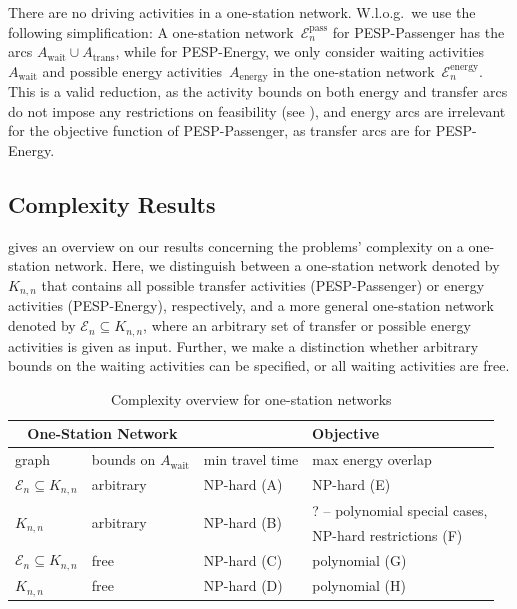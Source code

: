 \documentclass[11pt,a4paper]{article}
\newcommand{\wait}{\mathrm{wait}}
\newcommand{\transfer}{\mathrm{trans}}
\newcommand{\energy}{\mathrm{energy}}
\newcommand{\pesppassenger}{PESP-Passenger\xspace}
\newcommand{\pespenergy}{PESP-Energy\xspace}
\newcommand{\osn}{one-station network\xspace}
\newcommand{\cE}{\mathcal{E}}
\theoremstyle{definition}
\theoremstyle{remark}
\begin{document}
 There are no driving activities in a \osn. W.l.o.g.\ we use the following simplification: A \osn~$\cE_n^{\mathrm{pass}}$ for \pesppassenger has the arcs $A_\wait \cup A_{\transfer}$, while for \pespenergy, we only consider waiting activities~$A_\wait$ and possible energy activities~$A_\energy$ in the \osn~$\cE_n^{\energy}$. This is a valid reduction, as the activity bounds on both energy and transfer arcs do not impose any restrictions on feasibility (see ), and energy arcs are irrelevant for the objective function of \pesppassenger, as transfer arcs are for \pespenergy.

\subsection{Complexity Results}


 gives an overview on our results concerning the problems' complexity on a \osn. Here, we distinguish between a \osn denoted by $K_{n,n}$ 
that contains all possible transfer activities (\pesppassenger) or energy activities (\pespenergy), respectively, and a more general \osn denoted by $\mathcal E_n \subseteq K_{n,n}$, where an arbitrary set of transfer or possible energy activities is given as input. 
Further, we make a distinction whether arbitrary bounds on the waiting activities can be specified, or all waiting activities are free.


\begin{table}
\centering	

\begin{tabular}{|l|l|l|l|} 
	\hline
		\multicolumn{2}{|c|}{One-Station Network }  & 	\multicolumn{2}{|c|}{ Objective } \\  \hline
	graph & bounds on $A_{\wait}$ & min travel time  & max energy overlap \\  \hline	
	$\mathcal E_n \subseteq K_{n, n}$ & arbitrary & NP-hard (A) & NP-hard (E) \\
	\multirow{2}{*}{$K_{n,n}$} & \multirow{2}{*}{arbitrary} & \multirow{2}{*}{NP-hard (B)} & ? -- polynomial special cases, \\ 
		& & & \hphantom{? -- }NP-hard restrictions (F)\\	
	$\mathcal E_n \subseteq K_{n, n}$ & free & NP-hard (C) & polynomial (G) \\
	$K_{n,n}$ & free & NP-hard (D) & polynomial (H) \\
	  \hline
	 
	
\end{tabular} 	
\caption{Complexity overview for one-station networks}\label{Tab:complexity} 
\end{table}
\end{document}
